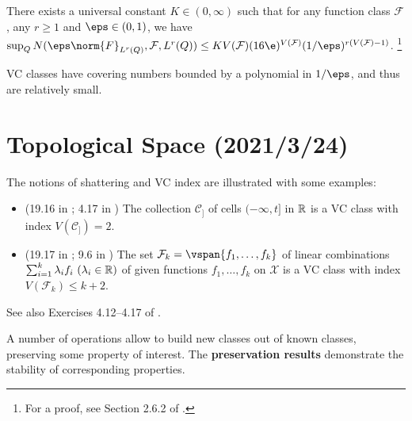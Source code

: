 \documentclass[12pt, a3paper, openany]{book}
\begin{document}
\begin{Lemma}
There exists a universal constant $K \in (0,\infty)$ such that for any function class $\mathcal{F}$, any $r \geq 1$ and $\eps \in (0,1)$, we have 
$ \sup_{Q} N(\eps\norm{F}_{L^{r}(Q)},\mathcal{F},L^{r}(Q)) \leq K V(\mathcal{F}) (16\e)^{V(\mathcal{F})} (1/\eps)^{r(V(\mathcal{F})-1)} $. \footnote{For a proof, see Section 2.6.2 of \cite{vdVaart-Wellner-1996-Weak}.}
\begin{remark}
VC classes have covering numbers bounded by a polynomial in $1/\eps$, and thus are relatively small.
\end{remark}
\end{Lemma}


\chapter{\bf Topological Space \sf\scriptsize (2021/3/24)}
The notions of shattering and VC index are illustrated with some examples:
\begin{itemize}
	\item (19.16 in \cite{vdVaart1998asymptotic}; 4.17 in \cite{Wainwright2019high})
The collection $\mathcal{C}_{]}$ of cells $(-\infty,t]$ in $\mathbb{R}$ is a VC class with index $V(\mathcal{C}_{]}) = 2$. 
	\item (19.17 in \cite{vdVaart1998asymptotic}; 9.6 in \cite{Kosorok2008Introduction})
The set $\mathcal{F}_{k} = \vspan{f_{1}, \dots, f_{k}}$ of linear combinations $\sum_{i=1}^{k} \lambda_{i} f_{i} \ (\lambda_{i}\in\R)$ of given functions $f_{1}, \dots, f_{k}$ on $\mathcal{X}$ is a VC class with index $V(\mathcal{F}_{k}) \leq k + 2$. 
\end{itemize}
See also Exercises 4.12--4.17 of \cite{Wainwright2019high}.

A number of operations allow to build new classes out of known classes, preserving some property of interest. The \textbf{preservation results} demonstrate the stability of corresponding properties.
\end{document}
